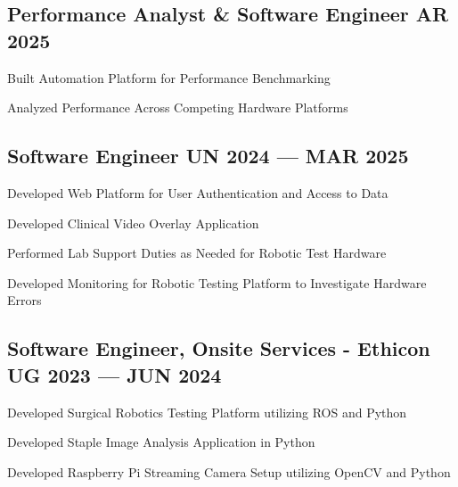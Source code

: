 \subsection{{Performance Analyst \& Software Engineer \texorpdfstring{\hfill} \texorpdfstring{\null} MAR 2025}}
\begin{zitemize}
\item Built Automation Platform for Performance Benchmarking
\item Analyzed Performance Across Competing Hardware Platforms
\end{zitemize}

\subsection{{Software Engineer \texorpdfstring{\hfill} \texorpdfstring{\null} JUN 2024 --- MAR 2025}}
\begin{zitemize}
\item Developed Web Platform for User Authentication and Access to Data
\item Developed Clinical Video Overlay Application
\item Performed Lab Support Duties as Needed for Robotic Test Hardware
\item Developed Monitoring for Robotic Testing Platform to Investigate Hardware Errors
\end{zitemize}

\subsection{{Software Engineer, Onsite Services - Ethicon \texorpdfstring{\hfill} \texorpdfstring{\null} AUG 2023 --- JUN 2024}}
\begin{zitemize}
\item Developed Surgical Robotics Testing Platform utilizing ROS and Python
\item Developed Staple Image Analysis Application in Python
\item Developed Raspberry Pi Streaming Camera Setup utilizing OpenCV and Python
\end{zitemize}

